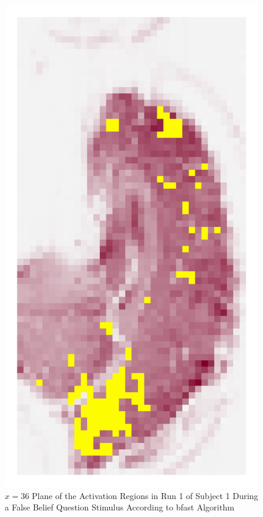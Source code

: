 \begin{figure}[htbp!]
\centering
\includegraphics[angle=90]{images/realDataYZ.png}
\caption{$x=36$ Plane of the Activation Regions in Run 1 of Subject 1 During a False Belief Question Stimulus According to \gls{bfast} Algorithm}
\label{fig:realDataYZ}
\end{figure}

